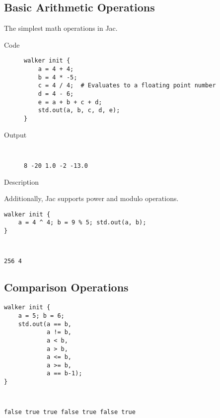 \subsection*{Basic Arithmetic Operations}
The simplest math operations in Jac.
\begin{description}
    \item[Code] \texttt{}
          \begin{lstlisting}[caption={Basic arithmetic operations}]
walker init {
    a = 4 + 4;
    b = 4 * -5;
    c = 4 / 4;  # Evaluates to a floating point number
    d = 4 - 6;
    e = a + b + c + d;
    std.out(a, b, c, d, e);
}
    \end{lstlisting}
    \item[Output] \texttt{ }
          \begin{lstlisting}[language=shell]
8 -20 1.0 -2 -13.0
        \end{lstlisting}
    \item[Description] \texttt{}
\end{description}

\noindent Additionally, Jac supports power and modulo operations.
\begin{description}
    \begin{lstlisting}[caption={Additional arithmetic operations}]
walker init {
    a = 4 ^ 4; b = 9 % 5; std.out(a, b);
}
    \end{lstlisting}
    \item[Output] \texttt{ }
          \begin{lstlisting}[language=shell]
256 4
        \end{lstlisting}
    \item[Description] \texttt{}
\end{description}


\subsection*{Comparison Operations}
\begin{description}
    \begin{lstlisting}[caption={Comparision operations}]
walker init {
    a = 5; b = 6;
    std.out(a == b,
            a != b,
            a < b,
            a > b,
            a <= b,
            a >= b,
            a == b-1);
}
    \end{lstlisting}
    \item[Output] \texttt{ }
          \begin{lstlisting}[language=shell]
false true true false true false true
        \end{lstlisting}
    \item[Description] \texttt{}
\end{description}


